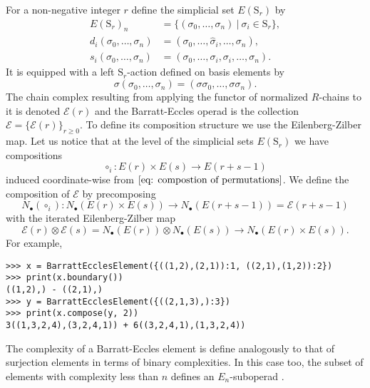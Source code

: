 \documentclass{amsart}
\renewcommand{\S}{\mathrm S}
\begin{document}
For a non-negative integer $r$ define the simplicial set $E(\mathrm S_r)$ by
\begin{align*}
E(\mathrm S_r)_n &= \{ (\sigma_0, \dots, \sigma_n)\ |\ \sigma_i \in \mathrm{S}_r\}, \\
d_i(\sigma_0, \dots, \sigma_n) &= (\sigma_0, \dots, \widehat{\sigma}_i, \dots, \sigma_n), \\
s_i(\sigma_0, \dots, \sigma_n) &= (\sigma_0, \dots, \sigma_i, \sigma_i, \dots, \sigma_n).
\end{align*}
It is equipped with a left $\mathrm S_r$-action defined on basis elements by
\begin{equation*}
\sigma (\sigma_0, \dots, \sigma_n) = (\sigma \sigma_0, \dots, \sigma \sigma_n).
\end{equation*}
The chain complex resulting from applying the functor of normalized $R$-chains to it is denoted $\mathcal E(r)$ and the Barratt-Eccles operad is the collection $\mathcal E = \{\mathcal E(r)\}_{r\geq0}$. To define its composition structure we use the Eilenberg-Zilber map. Let us notice that at the level of the simplicial sets $E(\S_r)$ we have compositions
\begin{equation*}
{\circ}_{i}: E(r) \times E(s) \to E(r + s - 1)
\end{equation*}
induced coordinate-wise from $\eqref{eq: compostion of permutations}$.
We define the composition of $\mathcal E$ by precomposing
\begin{equation*}
N_\bullet(\circ_i) \colon N_\bullet(E(r) \times E(s))
\longrightarrow
N_\bullet(E(r + s - 1)) = \mathcal E(r+s-1)
\end{equation*}
with the iterated Eilenberg-Zilber map
\begin{equation*}
\mathcal E(r) \otimes \mathcal E(s) =
N_\bullet(E(r)) \otimes N_\bullet(E(s))
\longrightarrow
N_\bullet(E(r) \times E(s)).
\end{equation*}
For example,
\begin{verbatim}
>>> x = BarrattEcclesElement({((1,2),(2,1)):1, ((2,1),(1,2)):2})
>>> print(x.boundary())
((1,2),) - ((2,1),)
>>> y = BarrattEcclesElement({((2,1,3),):3})
>>> print(x.compose(y, 2))
3((1,3,2,4),(3,2,4,1)) + 6((3,2,4,1),(1,3,2,4))
\end{verbatim}

The complexity of a Barratt-Eccles element is define analogously to that of surjection elements in terms of binary complexities. In this case too, the subset of elements with complexity less than $n$ defines an $E_n$-suboperad \cite{BergerFresse04}.
\end{document}
